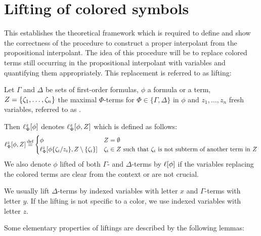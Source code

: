 \section{Lifting of colored symbols}
This establishes the theoretical framework which is required to define and show the correctness of the procedure to construct a proper interpolant from the propositional interpolant.
The idea of this procedure will be to replace colored terms still occurring in the propositional interpolant with variables and quantifying them appropriately.
This replacement is referred to as lifting:

\begin{defi}[Lifting]
	Let $\Gamma$ and $\Delta$ be sets of first-order formulas, 
	$\phi$ a formula or a term, $Z=\{\zeta_{1}, \dotsc, \zeta_{n}\}$ the maximal $\Phi$-terms for $\Phi \in \{\Gamma, \Delta\}$ in $\phi$ and $z_1, \ldots, z_n$ fresh variables, referred to as .

	Then $\ell_{\Phi}^{z}[\phi]$ denotes %
	$\ell_{\Phi}^{z}[\phi, Z]$ which is defined as follows:
\[\ell_{\Phi}^{z}[\phi, Z] \operatorname{\stackrel{\mathrm{def}}{=}} \begin{cases} \phi & Z = \emptyset \\ \ell_{\Phi}^{z}[\phi\{\zeta_{i}/z_i\}, Z\setminus\{\zeta_{i}\}] & \text{$\zeta_{i} \in Z$ such that $\zeta_{i}$ is not subterm of another term in $Z$} \end{cases}\]
	We also denote $\phi$ lifted of both $\Gamma$- and $\Delta$-terms by $\ell[\phi]$ if the variables replacing the colored terms are clear from the context or are not crucial.
\end{defi}

We usually lift $\Delta$-terms by indexed variables with letter $x$ and $\Gamma$-terms with letter $y$. If the lifting is not specific to a color, we use indexed variables with letter $z$.


Some elementary properties of liftings are described by the following lemmas:

